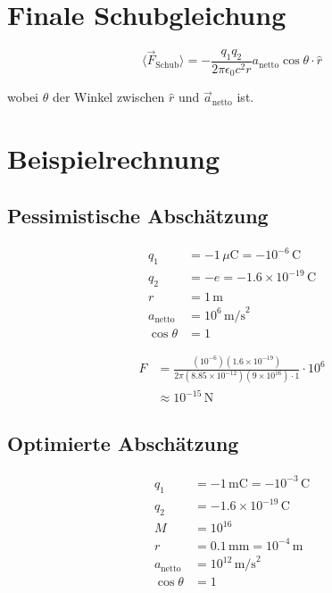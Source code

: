 \documentclass[11pt, a4paper]{article}
\begin{document}
\section{Finale Schubgleichung}

\begin{equation}
\boxed{
\langle \vec{F}_{\text{Schub}} \rangle = -\frac{q_1 q_2}{2\pi\epsilon_0 c^2 r} a_{\text{netto}} \cos\theta \cdot \hat{r}
}
\end{equation}

wobei $\theta$ der Winkel zwischen $\hat{r}$ und $\vec{a}_{\text{netto}}$ ist.

\section{Beispielrechnung}

\subsection{Pessimistische Abschätzung}

\begin{align*}
q_1 &= -1\,\mu\text{C} = -10^{-6}\,\text{C} \\
q_2 &= -e = -1.6 \times 10^{-19}\,\text{C} \\
r &= 1\,\text{m} \\
a_{\text{netto}} &= 10^6\,\text{m/s}^2 \\
\cos\theta &= 1
\end{align*}

\begin{align*}
F &= \frac{(10^{-6})(1.6 \times 10^{-19})}{2\pi (8.85 \times 10^{-12})(9 \times 10^{16}) \cdot 1} \cdot 10^6 \\
&\approx 10^{-15}\,\text{N}
\end{align*}

\subsection{Optimierte Abschätzung}

\begin{align*}
q_1 &= -1\,\text{mC} = -10^{-3}\,\text{C} \\
q_2 &= -1.6 \times 10^{-19}\,\text{C} \\
M &= 10^{16} \\
r &= 0.1\,\text{mm} = 10^{-4}\,\text{m} \\
a_{\text{netto}} &= 10^{12}\,\text{m/s}^2 \\
\cos\theta &= 1
\end{align*}
\end{document}
